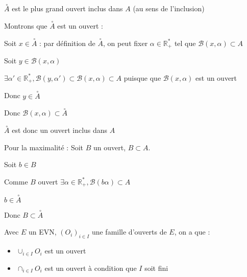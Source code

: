 \documentclass[a4paper,12pt]{book}
\newcommand{\Prop}[2]{\begin{tcolorbox}[sharp corners, colback=white,colframe=red!90!black!75, title=Proposition : #1]#2\end{tcolorbox}}
\newcommand{\Pre}[1]{\begin{tcolorbox}[sharp corners, colback=white,colframe=green!60!green!30!black!75, title=Preuve]#1\end{tcolorbox}}
\def\R{\mathbb{R}}
\begin{document}
\Prop{Plus grand ouvert}{$\overset{\circ}{A}$ est le plus grand ouvert inclus dans $A$ (au sens de l'inclusion)}
\Pre{Montrons que $\overset{\circ}{A}$ est un ouvert :
\par Soit $x\in\overset{\circ}{A}$ : par définition de $\overset{\circ}{A}$, on peut fixer $\alpha\in\R_+^*$ tel que $\mathcal{B}(x,\alpha)\subset A$ \par Soit $y\in\mathcal{B}(x,\alpha)$ \par $\exists \alpha'\in\R_+^*,\mathcal{B}(y, \alpha')\subset\mathcal{B}(x,\alpha)\subset A$ puisque que $\mathcal{B}(x,\alpha)$ est un ouvert
\par Donc $y\in\overset{\circ}{A}$ \par Donc $\mathcal{B}(x,\alpha)\subset\overset{\circ}{A}$ \par $\overset{\circ}{A}$ est donc un ouvert inclus dans $A$
\par Pour la maximalité : Soit $B$ un ouvert, $B\subset A$. \par Soit $b\in B$ \par Comme $B$ ouvert $\exists\alpha\in\R_+^*,\mathcal{B}(b\alpha)\subset A$ \par $b\in\overset{\circ}{A}$ \par Donc $B\subset\overset{\circ}{A}$}
\Prop{Réunion et intersection d'ouverts}{Avec $E$ un EVN, $(O_i)_{i\in I}$ une famille d'ouverts de $E$, on a que :\begin{itemize}
\item $\cup_{i\in I}O_i$ est un ouvert
\item $\cap_{i\in I}O_i$ est un ouvert à condition que $I$ soit fini\end{itemize}}
\end{document}
